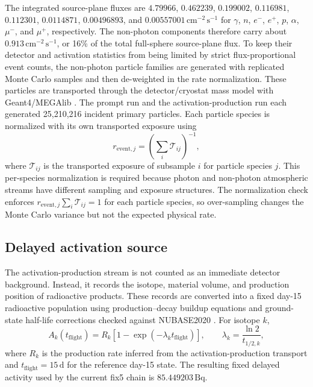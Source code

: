 \documentclass[preprint,12pt]{elsarticle}
\begin{document}
The integrated source-plane fluxes are $4.79966$, $0.462239$, $0.199002$, $0.116981$, $0.112301$, $0.0114871$, $0.00496893$, and $0.00557001\,\mathrm{cm^{-2}\,s^{-1}}$ for $\gamma$, $n$, $e^-$, $e^+$, $p$, $\alpha$, $\mu^-$, and $\mu^+$, respectively. The non-photon components therefore carry about $0.913\,\mathrm{cm^{-2}\,s^{-1}}$, or 16\% of the total full-sphere source-plane flux. To keep their detector and activation statistics from being limited by strict flux-proportional event counts, the non-photon particle families are generated with replicated Monte Carlo samples and then de-weighted in the rate normalization. These particles are transported through the detector/cryostat mass model with Geant4/MEGAlib \cite{Agostinelli2003,Zoglauer2006}. The prompt run and the activation-production run each generated 25,210,216 incident primary particles. Each particle species is normalized with its own transported exposure using
\begin{equation}
  r_{\mathrm{event},j}=\left(\sum_i \mathcal{T}_{ij}\right)^{-1},
\end{equation}
where $\mathcal{T}_{ij}$ is the transported exposure of subsample $i$ for particle species $j$. This per-species normalization is required because photon and non-photon atmospheric streams have different sampling and exposure structures. The normalization check enforces $r_{\mathrm{event},j}\sum_i\mathcal{T}_{ij}=1$ for each particle species, so over-sampling changes the Monte Carlo variance but not the expected physical rate.

\subsection{Delayed activation source}
\label{subsec:delayed_source}

The activation-production stream is not counted as an immediate detector background. Instead, it records the isotope, material volume, and production position of radioactive products. These records are converted into a fixed day-15 radioactive population using production--decay buildup equations and ground-state half-life corrections checked against NUBASE2020 \cite{Kondev2021NUBASE}. For isotope $k$,
\begin{equation}
  A_k(t_{\mathrm{flight}}) = R_k\left[1-\exp\left(-\lambda_k t_{\mathrm{flight}}\right)\right],
  \qquad \lambda_k = \frac{\ln 2}{t_{1/2,k}},
\end{equation}
where $R_k$ is the production rate inferred from the activation-production transport and $t_{\mathrm{flight}}=15\,\mathrm{d}$ for the reference day-15 state. The resulting fixed delayed activity used by the current fix5 chain is $85.449203\,\mathrm{Bq}$.
\end{document}

